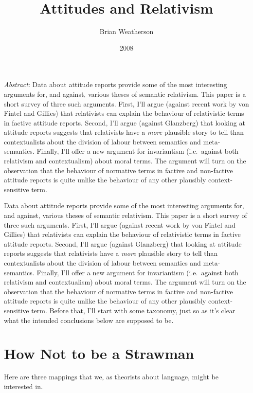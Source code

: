\documentclass[
  11pt,
  letterpaper,
  DIV=11,
  numbers=noendperiod,
  twoside]{scrartcl}
\title{Attitudes and Relativism}
\author{Brian Weatherson}
\date{2008}
\renewenvironment{abstract}
 {\vspace{-1.25cm}
 \quotation\small\noindent\emph{Abstract}:}
 {\endquotation}
\begin{document}
\maketitle
\begin{abstract}
Data about attitude reports provide some of the most interesting
arguments for, and against, various theses of semantic relativism. This
paper is a short survey of three such arguments. First, I'll argue
(against recent work by von Fintel and Gillies) that relativists can
explain the behaviour of relativistic terms in factive attitude reports.
Second, I'll argue (against Glanzberg) that looking at attitude reports
suggests that relativists have a \emph{more} plausible story to tell
than contextualists about the division of labour between semantics and
meta-semantics. Finally, I'll offer a new argument for invariantism
(i.e.~against both relativism and contextualism) about moral terms. The
argument will turn on the observation that the behaviour of normative
terms in factive and non-factive attitude reports is quite unlike the
behaviour of any other plausibly context-sensitive term.
\end{abstract}


Data about attitude reports provide some of the most interesting
arguments for, and against, various theses of semantic relativism. This
paper is a short survey of three such arguments. First, I'll argue
(against recent work by von Fintel and Gillies) that relativists can
explain the behaviour of relativistic terms in factive attitude reports.
Second, I'll argue (against Glanzberg) that looking at attitude reports
suggests that relativists have a \emph{more} plausible story to tell
than contextualists about the division of labour between semantics and
meta-semantics. Finally, I'll offer a new argument for invariantism
(i.e.~against both relativism and contextualism) about moral terms. The
argument will turn on the observation that the behaviour of normative
terms in factive and non-factive attitude reports is quite unlike the
behaviour of any other plausibly context-sensitive term. Before that,
I'll start with some taxonomy, just so as it's clear what the intended
conclusions below are supposed to be.

\section{How Not to be a Strawman}\label{how-not-to-be-a-strawman}

Here are three mappings that we, as theorists about language, might be
interested in.
\end{document}

